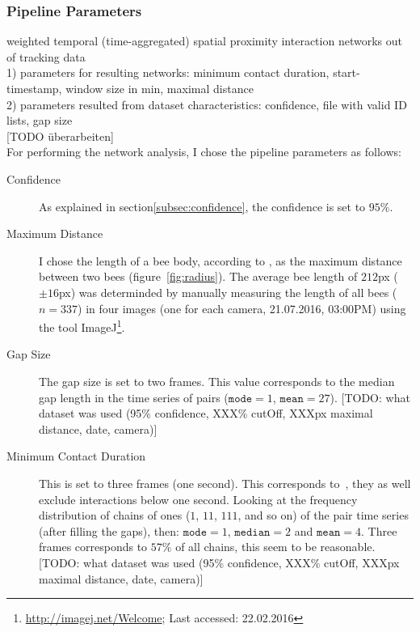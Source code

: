 \subsubsection{Pipeline Parameters}
weighted temporal (time-aggregated) spatial proximity interaction networks out of tracking data\\
1) parameters for resulting networks: minimum contact duration, start-timestamp, window size in min, maximal distance\\
2) parameters resulted from dataset characteristics: confidence, file with valid ID lists, gap size\\

[TODO überarbeiten]\\

For performing the network analysis, I chose the pipeline parameters as follows:

\begin{description}
\item[Confidence] As explained in section\ref{subsec:confidence}, the confidence is set to $95\%$.

\item[Maximum Distance] I chose the length of a bee body, according to \textcite{baracchi2014socio}, as the maximum distance between two bees (figure~\ref{fig:radius}). The average bee length of $212$px ($\pm 16$px)  was determinded by manually measuring the length of all bees ($n=337$) in four images (one for each camera, 21.07.2016, 03:00PM) using the tool ImageJ\footnote{\url{http://imagej.net/Welcome}; Last accessed: 22.02.2016}.

\item[Gap Size] The gap size is set to two frames. This value corresponds to the median gap length in the time series of pairs ($\texttt{mode}=1$, $\texttt{mean}=27$). [TODO: what dataset was used (95\% confidence, XXX\% cutOff, XXXpx maximal distance, date, camera)]

\item[Minimum Contact Duration] This is set to three frames (one second). This corresponds to~\textcite{mersch2013tracking}, they as well exclude interactions below one second. Looking at the frequency distribution of chains of ones ($1$, $11$, $111$, and so on) of the pair time series (after filling the gaps), then: $\texttt{mode}=1$, $\texttt{median}=2$ and $\texttt{mean}=4$. Three frames corresponds to $57\%$ of all chains, this seem to be reasonable. [TODO: what dataset was used (95\% confidence, XXX\% cutOff, XXXpx maximal distance, date, camera)]

\end{description}

